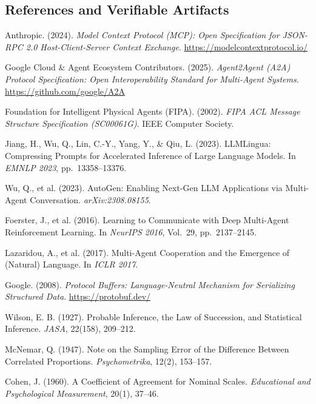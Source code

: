 \documentclass[9pt,a4paper]{extarticle}
\begin{document}
\subsection*{References and Verifiable Artifacts}
\begin{enumerate}[label={[\arabic*]},leftmargin=1.6em,itemsep=0.0pt,parsep=0pt,topsep=0.4pt]
  \item{\footnotesize Anthropic. (2024). \emph{Model Context Protocol (MCP): Open Specification for JSON-RPC 2.0 Host-Client-Server Context Exchange}. \url{https://modelcontextprotocol.io/}}
  \item{\footnotesize Google Cloud \& Agent Ecosystem Contributors. (2025). \emph{Agent2Agent (A2A) Protocol Specification: Open Interoperability Standard for Multi-Agent Systems}. \url{https://github.com/google/A2A}}
  \item{\footnotesize Foundation for Intelligent Physical Agents (FIPA). (2002). \emph{FIPA ACL Message Structure Specification (SC00061G)}. IEEE Computer Society.}
  \item{\footnotesize Jiang, H., Wu, Q., Lin, C.-Y., Yang, Y., \& Qiu, L. (2023). LLMLingua: Compressing Prompts for Accelerated Inference of Large Language Models. In \emph{EMNLP 2023}, pp.\ 13358--13376.}
  \item{\footnotesize Wu, Q., et al. (2023). AutoGen: Enabling Next-Gen LLM Applications via Multi-Agent Conversation. \emph{arXiv:2308.08155}.}
  \item{\footnotesize Foerster, J., et al. (2016). Learning to Communicate with Deep Multi-Agent Reinforcement Learning. In \emph{NeurIPS 2016}, Vol.\ 29, pp.\ 2137--2145.}
  \item{\footnotesize Lazaridou, A., et al. (2017). Multi-Agent Cooperation and the Emergence of (Natural) Language. In \emph{ICLR 2017}.}
  \item{\footnotesize Google. (2008). \emph{Protocol Buffers: Language-Neutral Mechanism for Serializing Structured Data}. \url{https://protobuf.dev/}}
  \item{\footnotesize Wilson, E. B. (1927). Probable Inference, the Law of Succession, and Statistical Inference. \emph{JASA}, 22(158), 209--212.}
  \item{\footnotesize McNemar, Q. (1947). Note on the Sampling Error of the Difference Between Correlated Proportions. \emph{Psychometrika}, 12(2), 153--157.}
  \item{\footnotesize Cohen, J. (1960). A Coefficient of Agreement for Nominal Scales. \emph{Educational and Psychological Measurement}, 20(1), 37--46.}

\end{enumerate}
\end{document}
